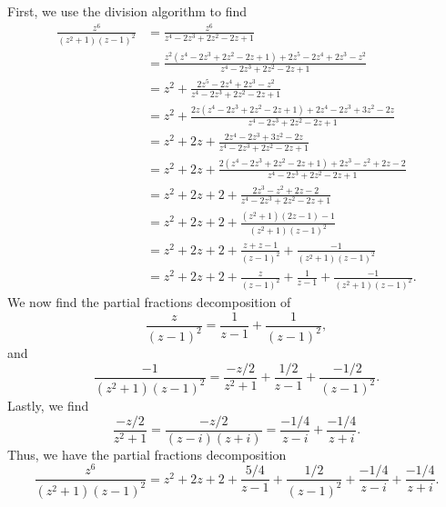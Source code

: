 \documentclass[12pt]{article}
\theoremstyle{definition}
\begin{document}
First, we use the division algorithm to find
\begin{align*}
    \frac{z^6}{(z^2 + 1)(z - 1)^2}
        &= \frac{z^6}{z^4 - 2z^3 + 2z^2 - 2z + 1} \\
        &= \frac{z^2(z^4 - 2z^3 + 2z^2 - 2z + 1) + 2z^5 - 2z^4 +2z^3 - z^2}{z^4 - 2z^3 + 2z^2 - 2z + 1} \\
        &= z^2 + \frac{2z^5 - 2z^4 +2z^3 - z^2}{z^4 - 2z^3 + 2z^2 - 2z + 1} \\
        &= z^2 + \frac{2z(z^4 - 2z^3 + 2z^2 - 2z + 1) + 2z^4 - 2z^3 + 3z^2 - 2z}{z^4 - 2z^3 + 2z^2 - 2z + 1} \\
        &= z^2 + 2z + \frac{2z^4 - 2z^3 + 3z^2 - 2z}{z^4 - 2z^3 + 2z^2 - 2z + 1} \\
        &= z^2 + 2z + \frac{2(z^4 - 2z^3 + 2z^2 - 2z + 1) + 2z^3 - z^2 + 2z - 2}{z^4 - 2z^3 + 2z^2 - 2z + 1} \\
        &= z^2 + 2z + 2 + \frac{2z^3 - z^2 + 2z - 2}{z^4 - 2z^3 + 2z^2 - 2z + 1} \\
        &= z^2 + 2z + 2 + \frac{(z^2 + 1)(2z - 1) - 1}{(z^2 + 1)(z - 1)^2} \\
        &= z^2 + 2z + 2 + \frac{z + z - 1}{(z - 1)^2} + \frac{- 1}{(z^2 + 1)(z - 1)^2} \\
        &= z^2 + 2z + 2 + \frac{z}{(z - 1)^2} + \frac{1}{z - 1} + \frac{-1}{(z^2 + 1)(z - 1)^2}.
\end{align*}
We now find the partial fractions decomposition of
\[
    \frac{z}{(z - 1)^2} = \frac{1}{z - 1} + \frac{1}{(z - 1)^2},
\]
and
\[
    \frac{-1}{(z^2 + 1)(z - 1)^2} = \frac{-z/2}{z^2 + 1} + \frac{1/2}{z - 1} + \frac{-1/2}{(z - 1)^2}.
\]
Lastly, we find
\[
    \frac{-z/2}{z^2 + 1} = \frac{-z/2}{(z - i)(z + i)} = \frac{-1/4}{z - i} + \frac{-1/4}{z + i}.
\]
Thus, we have the partial fractions decomposition
\[
    \frac{z^6}{(z^2 + 1)(z - 1)^2}
        = z^2 + 2z + 2 + \frac{5/4}{z - 1} + \frac{1/2}{(z - 1)^2} + \frac{-1/4}{z - i} + \frac{-1/4}{z + i}.
\]
\end{document}
